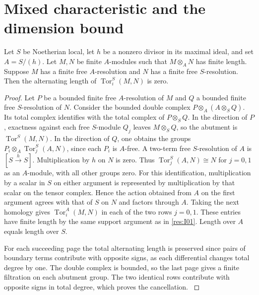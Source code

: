 \section{Mixed characteristic and the dimension bound}

\begin{lemma}\label{res:I10}
Let \(S\) be Noetherian local, let \(h\) be a nonzero divisor in
its maximal ideal, and set \(A=S/(h)\). Let \(M,N\) be finite
\(A\)-modules such that \(M\otimes_A N\) has finite length.
Suppose \(M\) has a finite free \(A\)-resolution and \(N\) has a
finite free \(S\)-resolution. Then the alternating length of
\(\operatorname{Tor}_i^S(M,N)\) is zero.
\end{lemma}
\begin{proof}
Let \(P\) be a bounded finite free \(A\)-resolution of \(M\) and
\(Q\) a bounded finite free \(S\)-resolution of \(N\). Consider
the bounded double complex \(P\otimes_A(A\otimes_S Q)\).
Its total complex identifies with the total complex of
\(P\otimes_S Q\). In the direction of \(P\), exactness against
each free \(S\)-module \(Q_j\) leaves \(M\otimes_S Q\), so the
abutment is \(\operatorname{Tor}^S(M,N)\).
In the direction of \(Q\), one obtains the groups
\(P_i\otimes_A \operatorname{Tor}_j^S(A,N)\), since each \(P_i\)
is \(A\)-free. A two-term free \(S\)-resolution of \(A\) is
\([S\xrightarrow{h}S]\). Multiplication by \(h\) on \(N\) is
zero. Thus \(\operatorname{Tor}_j^S(A,N)\cong N\) for \(j=0,1\)
as an \(A\)-module, with all other groups zero. For this
identification, multiplication by a scalar in \(S\) on either
argument is represented by multiplication by that scalar on
the tensor complex. Hence the action obtained from \(A\) on
the first argument agrees with that of \(S\) on \(N\) and
factors through \(A\). Taking the next
homology gives \(\operatorname{Tor}_i^A(M,N)\) in each of the
two rows \(j=0,1\). These entries have finite length by the
same support argument as in \ref{res:I01}. Length over \(A\)
equals length over \(S\).

For each succeeding page the total alternating length is
preserved since pairs of boundary terms contribute with opposite
signs, as each differential changes total degree by one.
The double complex is bounded, so the last page gives a finite
filtration on each abutment group. The two identical rows
contribute with opposite signs in total degree, which proves
the cancellation. \cite[Chapter V, \S B.5]{serre-local}
\end{proof}


